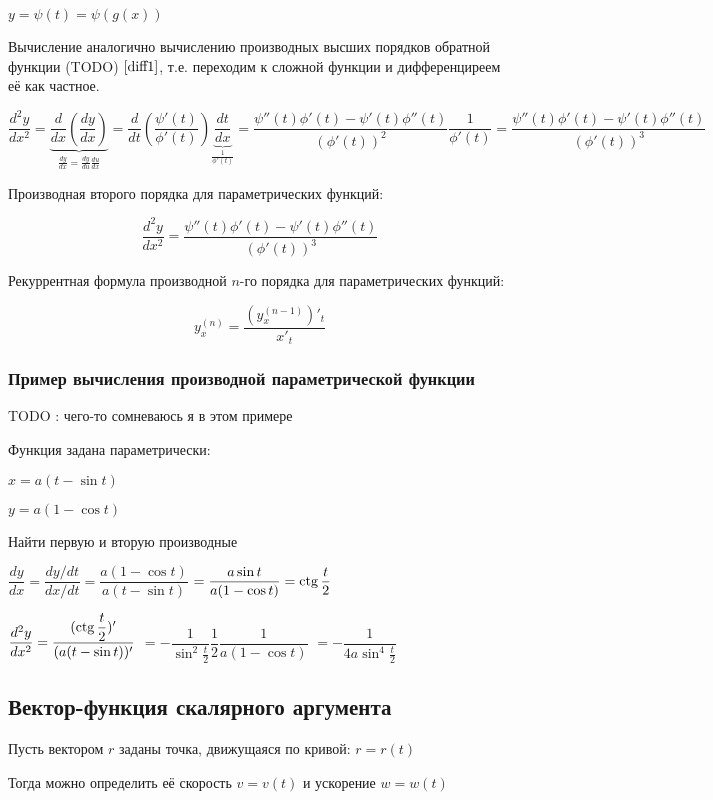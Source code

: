 $ y = \psi(t) = \psi( g(x) ) $

Вычисление аналогично вычислению производных высших порядков обратной функции (TODO) $ \ref{diff1} $,
т.е. переходим к сложной функции и дифференциреем её как частное.

$ \dfrac{d^{2}y}{dx^{2}} = 
\underbrace{
\dfrac{d}{dx} 
\left( \dfrac{dy}{dx} \right)
}_{\frac{dy}{dx} = \frac{dy}{du}\frac{du}{dx}} =
\dfrac{d}{dt} 
\left( 
\dfrac{\psi'(t)}{\phi'(t)} 
\right)
\underbrace{
\dfrac{dt}{dx}
}_{\frac{1}{\phi'(t)}} =
\dfrac{ \psi''(t)\phi'(t)-\psi'(t)\phi''(t)  }{(\phi'(t))^{2}}
\dfrac{1}{\phi'(t)}
=
\dfrac{ \psi''(t)\phi'(t)-\psi'(t)\phi''(t)  }{(\phi'(t))^{3}}
$

Производная второго порядка для параметрических функций:

$$
\dfrac{d^{2}y}{dx^{2}}
=
\dfrac{ \psi''(t)\phi'(t)-\psi'(t)\phi''(t)  }{(\phi'(t))^{3}}
$$

Рекуррентная формула производной $n$-го порядка для параметрических функций:

$$
y^{(n)}_x = \dfrac{ (y^{(n-1)}_x)'_t }{x'_t}
$$


\subsubsection{Пример вычисления производной параметрической функции}

TODO : чего-то сомневаюсь я в этом примере

Функция задана параметрически:

$ x = a(t - \sin t) $

$ y = a(1 - \cos t) $

Найти первую и вторую производные

$ \dfrac{dy}{dx} = \dfrac{dy/dt}{dx/dt} = \dfrac{a(1 - \cos t) }{a(t - \sin t)}$
$ = \dfrac{ a\sin t }{a(1 - \cos t)} = \operatorname{ctg} \dfrac{t}{2} $

$ \dfrac{d^{2}y}{dx^{2}} = \dfrac{(\operatorname{ctg} \dfrac{t}{2})'}{ (a(t - \sin t))' } $
$ = - \dfrac{1}{\sin^{2} \frac{t}{2} } \dfrac{1}{2}  \dfrac{1}{a(1 - \cos t)}$
$ = - \dfrac{1}{4a \sin^{4} \frac{t}{2}} $


\subsection{Вектор-функция скалярного аргумента}

Пусть вектором $ r $ заданы точка, движущаяся по кривой:  $ r = r(t) $

Тогда можно определить её скорость $ v = v(t) $ и ускорение $ w = w(t) $

